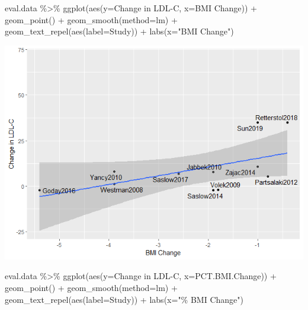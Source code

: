 \documentclass[
]{article}
\newenvironment{Shaded}{\begin{snugshade}}{\end{snugshade}}
\newcommand{\AttributeTok}[1]{\textcolor[rgb]{0.77,0.63,0.00}{#1}}
\newcommand{\FunctionTok}[1]{\textcolor[rgb]{0.00,0.00,0.00}{#1}}
\newcommand{\NormalTok}[1]{#1}
\newcommand{\SpecialCharTok}[1]{\textcolor[rgb]{0.00,0.00,0.00}{#1}}
\newcommand{\StringTok}[1]{\textcolor[rgb]{0.31,0.60,0.02}{#1}}
\begin{document}
\begin{Shaded}
\begin{Highlighting}[]
\NormalTok{eval.data }\SpecialCharTok{\%\textgreater{}\%}
  \FunctionTok{ggplot}\NormalTok{(}\FunctionTok{aes}\NormalTok{(}\AttributeTok{y=}\StringTok{\textasciigrave{}}\AttributeTok{Change in LDL{-}C}\StringTok{\textasciigrave{}}\NormalTok{,}
             \AttributeTok{x=}\StringTok{\textasciigrave{}}\AttributeTok{BMI Change}\StringTok{\textasciigrave{}}\NormalTok{)) }\SpecialCharTok{+}
  \FunctionTok{geom\_point}\NormalTok{() }\SpecialCharTok{+}
  \FunctionTok{geom\_smooth}\NormalTok{(}\AttributeTok{method=}\StringTok{\textquotesingle{}lm\textquotesingle{}}\NormalTok{) }\SpecialCharTok{+}
  \FunctionTok{geom\_text\_repel}\NormalTok{(}\FunctionTok{aes}\NormalTok{(}\AttributeTok{label=}\NormalTok{Study)) }\SpecialCharTok{+}
  \FunctionTok{labs}\NormalTok{(}\AttributeTok{x=}\StringTok{"BMI Change"}\NormalTok{)}
\end{Highlighting}
\end{Shaded}

\includegraphics{figures/ldl-change-vs-weight-change-2.png}

\begin{Shaded}
\begin{Highlighting}[]
\NormalTok{eval.data }\SpecialCharTok{\%\textgreater{}\%}
  \FunctionTok{ggplot}\NormalTok{(}\FunctionTok{aes}\NormalTok{(}\AttributeTok{y=}\StringTok{\textasciigrave{}}\AttributeTok{Change in LDL{-}C}\StringTok{\textasciigrave{}}\NormalTok{,}
             \AttributeTok{x=}\StringTok{\textasciigrave{}}\AttributeTok{PCT.BMI.Change}\StringTok{\textasciigrave{}}\NormalTok{)) }\SpecialCharTok{+}
  \FunctionTok{geom\_point}\NormalTok{() }\SpecialCharTok{+}
  \FunctionTok{geom\_smooth}\NormalTok{(}\AttributeTok{method=}\StringTok{\textquotesingle{}lm\textquotesingle{}}\NormalTok{) }\SpecialCharTok{+}
  \FunctionTok{geom\_text\_repel}\NormalTok{(}\FunctionTok{aes}\NormalTok{(}\AttributeTok{label=}\NormalTok{Study)) }\SpecialCharTok{+}
  \FunctionTok{labs}\NormalTok{(}\AttributeTok{x=}\StringTok{"\% BMI Change"}\NormalTok{)}
\end{Highlighting}
\end{Shaded}
\end{document}
